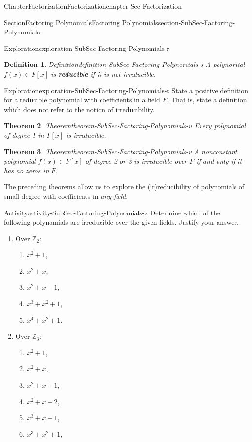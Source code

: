 \documentclass[oneside,10pt,]{book}
\newcommand{\terminology}[1]{\textbf{#1}}
\numberwithin{equation}{section}
\def\Z{{\mathbb Z}}
\newtheorem{theorem}{Theorem}[section]
\newtheorem{definition}[theorem]{Definition}
\begin{document}
\begin{chapterptx}{Chapter}{Factorization}{}{Factorization}{}{}{chapter-Sec-Factorization}
\begin{sectionptx}{Section}{Factoring Polynomials}{}{Factoring Polynomials}{}{}{section-SubSec-Factoring-Polynomials}
\begin{exploration}{Exploration}{}{exploration-SubSec-Factoring-Polynomials-r}
\end{exploration}%
\begin{definition}{Definition}{}{definition-SubSec-Factoring-Polynomials-s}%
%
A polynomial \(f(x)\in F[x]\) is \terminology{reducible} if it is not irreducible.%
\end{definition}
\begin{exploration}{Exploration}{}{exploration-SubSec-Factoring-Polynomials-t}%
State a positive definition for a reducible polynomial with coefficients in a field \(F\). That is, state a definition which does not refer to the notion of irreducibility.%
\end{exploration}%
\begin{theorem}{Theorem}{}{}{theorem-SubSec-Factoring-Polynomials-u}%
Every polynomial of degree 1 in \(F[x]\) is irreducible.%
\end{theorem}
\begin{theorem}{Theorem}{}{}{theorem-SubSec-Factoring-Polynomials-v}%
A nonconstant polynomial \(f(x)\in F[x]\) of degree 2 or 3 is irreducible over \(F\) if and only if it has no zeros in \(F\).%
\end{theorem}
The preceding theorems allow us to explore the (ir)reducibility of polynomials of small degree with coefficients in \emph{any field}.%
\begin{activity}{Activity}{}{activity-SubSec-Factoring-Polynomials-x}%
Determine which of the following polynomials are irreducible over the given fields. Justify your answer.%
%
\begin{enumerate}
\item{}Over \(\Z_2\):%
%
\begin{enumerate}
\item{}\(x^2 + 1\),%
\item{}\(x^2 + x\),%
\item{}\(x^2 +x +1\),%
\item{}\(x^3 + x^2 + 1\),%
\item{}\(x^4 + x^2 + 1\).%
\end{enumerate}
\item{}Over \(\Z_3\):%
%
\begin{enumerate}
\item{}\(x^2 + 1\),%
\item{}\(x^2 + x\),%
\item{}\(x^2 +x +1\),%
\item{}\(x^2 +x +2\),%
\item{}\(x^3 + x +1\),%
\item{}\(x^3 + x^2 + 1\),%

\end{enumerate}
\end{enumerate}
\end{activity}
\end{sectionptx}
\end{chapterptx}
\end{document}
